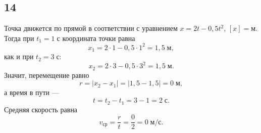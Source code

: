 \subsection{14}

Точка движется по прямой в соответствии с уравнением $x=2t-0{,}5t^2$, $[x]=\text{м}$. Тогда при $t_1=1\;\text{с}$ координата точки равна
\[
x_1=2\cdot1-0{,}5\cdot1^2=1{,}5\;\text{м},
\]
как и при $t_2=3\;\text{с}$:
\[
x_2=2\cdot3-0{,}5\cdot3^2=1{,}5\;\text{м}.
\]
Значит, перемещение равно
\[
r=|x_2-x_1|=|1{,}5-1{,}5|=0\;\text{м},
\]
а время в пути ---
\[
t=t_2-t_1=3-1=2\;\text{с}.
\]
Средняя скорость равна
\[
v_\text{ср}=\frac{r}{t}=\frac{0}{2}=0\;\text{м/с}.
\]